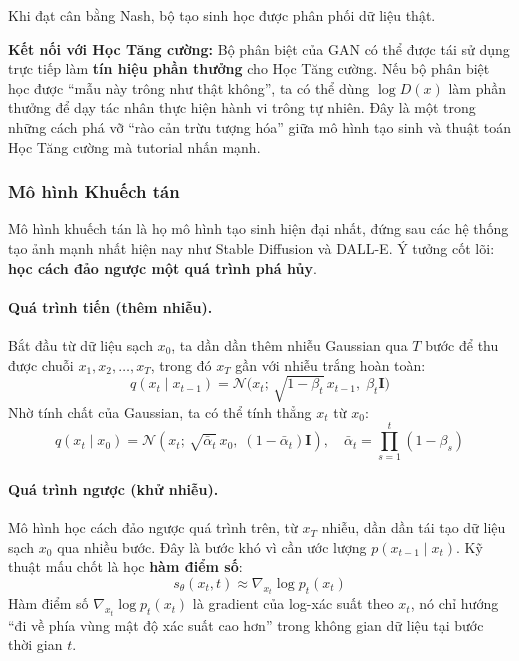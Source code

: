 Khi đạt cân bằng Nash, bộ tạo sinh học được phân phối dữ liệu thật.

\textbf{Kết nối với Học Tăng cường:} Bộ phân biệt của GAN có thể được tái sử dụng
trực tiếp làm \textbf{tín hiệu phần thưởng} cho Học Tăng cường. Nếu bộ phân biệt học
được ``mẫu này trông như thật không'', ta có thể dùng $\log D(x)$ làm
phần thưởng để dạy tác nhân thực hiện hành vi trông tự nhiên. Đây là một
trong những cách phá vỡ ``rào cản trừu tượng hóa'' giữa mô hình tạo sinh
và thuật toán Học Tăng cường mà tutorial nhấn mạnh.

\subsubsection{Mô hình Khuếch tán}
 
Mô hình khuếch tán là họ mô hình tạo sinh hiện đại nhất, đứng sau các
hệ thống tạo ảnh mạnh nhất hiện nay như Stable Diffusion và DALL-E.
Ý tưởng cốt lõi: \textbf{học cách đảo ngược một quá trình phá hủy}.

\paragraph{Quá trình tiến (thêm nhiễu).}

Bắt đầu từ dữ liệu sạch $x_0$, ta dần dần thêm nhiễu Gaussian qua
$T$ bước để thu được chuỗi $x_1, x_2, \ldots, x_T$, trong đó $x_T$
gần với nhiễu trắng hoàn toàn:
\[
    q(x_t \mid x_{t-1}) = \mathcal{N}\bigl(x_t;\, \sqrt{1-\beta_t}\,
    x_{t-1},\; \beta_t \mathbf{I}\bigr)
\]
Nhờ tính chất của Gaussian, ta có thể tính thẳng $x_t$ từ $x_0$:
\[
    q(x_t \mid x_0) = \mathcal{N}(x_t;\, \sqrt{\bar{\alpha}_t}\,x_0,\;
    (1-\bar{\alpha}_t)\mathbf{I}), \quad
    \bar{\alpha}_t = \prod_{s=1}^t (1-\beta_s)
\]

\paragraph{Quá trình ngược (khử nhiễu).}

Mô hình học cách đảo ngược quá trình trên, từ $x_T$ nhiễu, dần
dần tái tạo dữ liệu sạch $x_0$ qua nhiều bước. Đây là bước khó vì
cần ước lượng $p(x_{t-1} \mid x_t)$. Kỹ thuật mấu chốt là học
\textbf{hàm điểm số}:
\[
    s_\theta(x_t, t) \approx \nabla_{x_t} \log p_t(x_t)
\]
Hàm điểm số $\nabla_{x_t} \log p_t(x_t)$ là gradient của
log-xác suất theo $x_t$, nó chỉ hướng ``đi về phía vùng mật độ
xác suất cao hơn'' trong không gian dữ liệu tại bước thời gian $t$.

